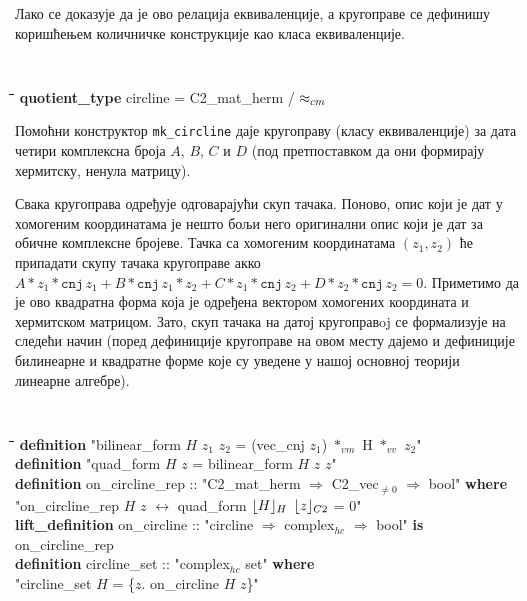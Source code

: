 Лако се доказује да је ово релација еквиваленције, а кругоправе се
дефинишу коришћењем количничке конструкције као класа еквиваленције.

{\tt
\begin{tabbing}
\hspace{5mm}\=\hspace{5mm}\=\hspace{5mm}\=\hspace{5mm}\=\hspace{5mm}\=\kill
\textbf{quotient\_type} circline = C2\_mat\_herm / $\approx_{cm}$
\end{tabbing}
}

Помоћни конструктор {\tt mk\_circline} даје кругоправу (класу
еквиваленције) за дата четири комплексна броја $A$, $B$, $C$ и $D$
(под претпоставком да они формирају хермитску, ненула матрицу).

Свака кругоправа одређује одговарајући скуп тачака. Поново, опис који
је дат у хомогеним координатама је нешто бољи него оригинални опис
који је дат за обичне комплексне бројеве. Тачка са хомогеним
координатама $(z_1, z_2)$ ће припадати скупу тачака кругоправе акко
$A*z_1*\mathtt{cnj}\,z_1 + B*\mathtt{cnj}\,z_1*z_2 +
C*z_1*\mathtt{cnj}\,z_2 + D*z_2*\mathtt{cnj}\,z_2 = 0$. Приметимо да
је ово квадратна форма која је одређена вектором хомогених координата
и хермитском матрицом. Зато, скуп тачака на датој кругоправoj се
формализује на следећи начин (поред дефиниције кругоправе на овом
месту дајемо и дефиниције билинеарне и квадратне форме које су уведене
у нашој основној теорији линеарне алгебре).

{\tt
\begin{tabbing}
\hspace{5mm}\=\hspace{5mm}\=\hspace{5mm}\=\hspace{5mm}\=\hspace{5mm}\=\kill
\textbf{definition} "bilinear\_form $H$ $z_1$ $z_2$ = (vec\_cnj $z_1$) $*_{vm}$ H $*_{vv}$ $z_2$"\\
\textbf{definition} "quad\_form $H$ $z$ = bilinear\_form $H$ $z$ $z$"\\
\textbf{definition} on\_circline\_rep :: "C2\_mat\_herm $\Rightarrow$ C2\_vec$_{\neq 0}$ $\Rightarrow$ bool" \textbf{where}\\
\>"on\_circline\_rep $H$ $z$ $\longleftrightarrow$ quad\_form $\lfloor H\rfloor_{H}$ $\lfloor z\rfloor_{C2}$ = 0"\\
\textbf{lift\_definition} on\_circline :: "circline $\Rightarrow$ complex$_{hc}$ $\Rightarrow$ bool" \textbf{is}\\
\> on\_circline\_rep\\
\textbf{definition} circline\_set :: "complex$_{hc}$ set" \textbf{where} \\
\>"circline\_set $H$ = \{$z$. on\_circline $H$ $z$\}"
\end{tabbing}
}

